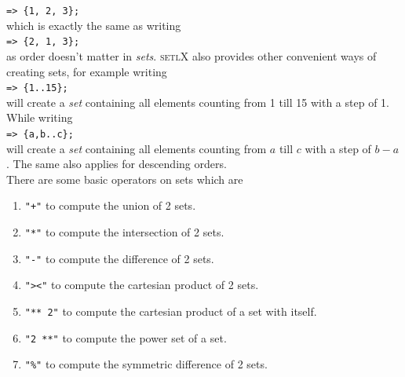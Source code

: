 \documentclass[11pt]{article}
\begin{document}
\hspace*{1.3cm}
\texttt{=> \{1, 2, 3\};}
\\[0.2cm]
which is exactly the same as writing
\\[0.2cm]
\hspace*{1.3cm}
\texttt{=> \{2, 1, 3\};}
\\[0.2cm]
as order doesn't matter in \textsl{sets}. \textsc{setlX} also provides other convenient ways of creating sets, for example writing
\\[0.2cm]
\hspace*{1.3cm}
\texttt{=> \{1..15\};}
\\[0.2cm]
will create a \textsl{set} containing all elements counting from 1 till 15 with a step of 1. While writing
\\[0.2cm]
\hspace*{1.3cm}
\texttt{=> \{a,b..c\};}
\\[0.2cm]
will create a \textsl{set} containing all elements counting from $a$ till $c$ with a step of $b-a$. The same also applies for descending orders.
\\
There are some basic operators on sets which are
\begin{enumerate}
\item \texttt{"+"} to compute the union of 2 sets.
\item \texttt{"*"} to compute the intersection of 2 sets.
\item \texttt{"-"} to compute the difference of 2 sets.
\item \texttt{"><"} to compute the cartesian product of 2 sets.
\item \texttt{"** 2"} to compute the cartesian product of a set with itself.
\item \texttt{"2 **"} to compute the power set of a set.
\item \texttt{"\%"} to compute the symmetric difference of 2 sets.
\end{enumerate}
\end{document}
